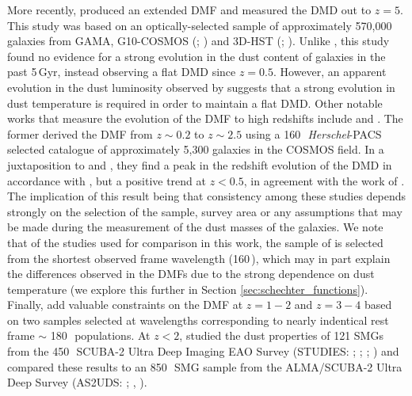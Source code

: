 More recently, \citealt{Driver_2018} produced an extended DMF and measured the DMD out to $z = 5$. This study was based on an optically-selected sample of approximately 570,000 galaxies from GAMA, G10-COSMOS (\citealt{Davies_2015}; \citealt{Andrews_2017}) and 3D-HST (\citealt{Brammer_2012}; \citealt{Momcheva_2016}). Unlike \citealt{Dunne_2011}, this study found no evidence for a strong evolution in the dust content of galaxies in the past 5\,Gyr, instead observing a flat DMD since $z = 0.5$. However, an apparent evolution in the dust luminosity observed by \citealt{Driver_2018} suggests that a strong evolution in dust temperature is required in order to maintain a flat DMD. Other notable works that measure the evolution of the DMF to high redshifts include \citealt{Pozzi_2020} and \citealt{Dudzeviciute_2021}. The former derived the DMF from $z \sim 0.2$ to $z \sim 2.5$ using a 160\,\micron\ \textit{Herschel}-PACS selected catalogue of approximately 5,300 galaxies in the COSMOS field. In a juxtaposition to \citealt{Dunne_2011} and \citealt{Driver_2018}, they find a peak in the redshift evolution of the DMD in accordance with \citealt{Driver_2018}, but a positive trend at $z < 0.5$, in agreement with the work of \citealt{Dunne_2011}. The implication of this result being that consistency among these studies depends strongly on the selection of the sample, survey area or any assumptions that may be made during the measurement of the dust masses of the galaxies. We note that of the studies used for comparison in this work, the sample of \citealt{Pozzi_2020} is selected from the shortest observed frame wavelength (160\,\micron), which may in part explain the differences observed in the DMFs due to the strong dependence on dust temperature (we explore this further in Section \ref{sec:schechter_functions}). Finally, \citealt{Dudzeviciute_2021} add valuable constraints on the DMF at $z = 1 - 2$ and $z = 3 - 4$ based on two samples selected at wavelengths corresponding to nearly indentical rest frame $\sim$ 180\,\micron\ populations. At $z < 2$, \citealt{Dudzeviciute_2021} studied the dust properties of 121 SMGs from the 450\,\micron\ SCUBA-2 Ultra Deep Imaging EAO Survey (STUDIES: \citealt{Wang_2017}; \citealt{Chang_2018}; \citealt{Lim_2020b}; \citealt{Lim_2020c}) and compared these results to an 850\,\micron\ SMG sample from the ALMA/SCUBA-2 Ultra Deep Survey (AS2UDS: \citealt{Stach_2018}; \citealt{Stach_2019}, \citealt{Dudzeviciute_2020}). 

